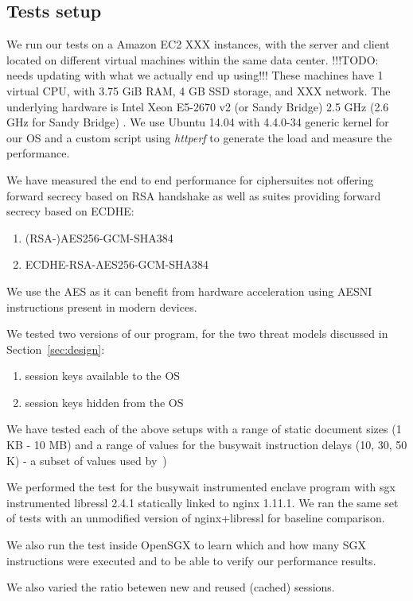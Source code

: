 \documentclass[../main.tex]{subfiles}
\begin{document}
\subsection{Tests setup}
We run our tests on a Amazon EC2 XXX instances, with the server and
client located on different virtual machines within the same data center.
!!!TODO: needs updating with what we actually end up using!!! These machines
have 1 virtual CPU, with 3.75 GiB RAM, 4 GB SSD storage, and XXX network. The
underlying hardware is Intel Xeon E5-2670 v2 (or Sandy Bridge) 2.5 GHz
(2.6 GHz for Sandy Bridge) \cite{aws_instances}. We use Ubuntu 14.04 with 
4.4.0-34 generic kernel for our OS and a custom script using \textit{httperf}
to generate the load and measure the performance.

We have measured the end to end performance for ciphersuites not offering
forward secrecy based on RSA handshake as well as suites providing forward
secrecy based on ECDHE:
\begin{enumerate}
  \item (RSA-)AES256-GCM-SHA384
  \item ECDHE-RSA-AES256-GCM-SHA384
\end{enumerate}

We use the AES as it can benefit from hardware acceleration using AESNI
instructions present in modern devices.

We tested two versions of our program, for the two threat models discussed in
Section~\ref{sec:design}:
\begin{enumerate}
  \item session keys available to the OS
  \item session keys hidden from the OS
\end{enumerate}

We have tested each of the above setups with a range of static document sizes
(1 KB - 10 MB) and a range of values for the busywait instruction delays (10,
30, 50 K) - a subset of values used by~\cite{Baumann14})

We performed the test for the busywait instrumented enclave program with sgx
instrumented libressl 2.4.1 statically linked to nginx 1.11.1. We ran the same
set of tests with an unmodified version of nginx+libressl for baseline
comparison.

We also run the test inside OpenSGX to learn which and how many SGX
instructions were executed and to be able to verify our performance results.

We also varied the ratio betewen new and reused (cached) sessions.
\end{document}
